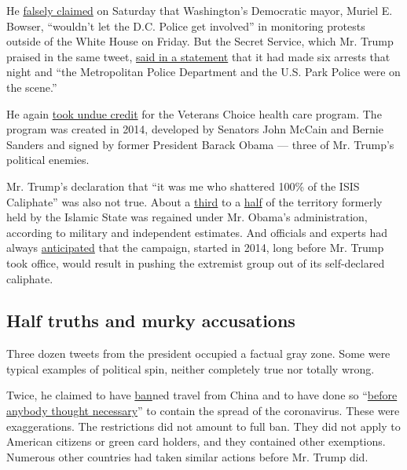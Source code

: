 He
\href{https://twitter.com/realDonaldTrump/status/1266711224391213056}{falsely
claimed} on Saturday that Washington's Democratic mayor, Muriel E.
Bowser, ``wouldn't let the D.C. Police get involved'' in monitoring
protests outside of the White House on Friday. But the Secret Service,
which Mr. Trump praised in the same tweet,
\href{https://www.secretservice.gov/data/press/releases/2020/20-MAY/Secret-Service-Statement-on-Pennsylvania-Avenue-Demonstrations.pdf}{said
in a statement} that it had made six arrests that night and ``the
Metropolitan Police Department and the U.S. Park Police were on the
scene.''

He again
\href{https://twitter.com/realDonaldTrump/status/1265834167272603649}{took
undue credit} for the Veterans Choice health care program. The program
was created in 2014, developed by Senators John McCain and Bernie
Sanders and signed by former President Barack Obama --- three of Mr.
Trump's political enemies.

Mr. Trump's declaration that ``it was me who shattered 100\% of the ISIS
Caliphate'' was also not true. About a
\href{https://news.ihsmarkit.com/prviewer/release_only/slug/aerospace-defense-security-islamic-state-territory-down-60-percent-and-revenue-down-80}{third}
to a
\href{https://web.archive.org/web/20171222214247/https://www.state.gov/r/pa/prs/ps/2017/12/276746.htm}{half}
of the territory formerly held by the Islamic State was regained under
Mr. Obama's administration, according to military and independent
estimates. And officials and experts had always
\href{https://www.nytimes3xbfgragh.onion/2017/10/17/us/politics/trump-islamic-state-raqqa-fact-check.html}{anticipated}
that the campaign, started in 2014, long before Mr. Trump took office,
would result in pushing the extremist group out of its self-declared
caliphate.

\hypertarget{half-truths-and-murky-accusations}{%
\subsection{Half truths and murky
accusations}\label{half-truths-and-murky-accusations}}

Three dozen tweets from the president occupied a factual gray zone. Some
were typical examples of political spin, neither completely true nor
totally wrong.

Twice, he claimed to have
\href{https://twitter.com/realDonaldTrump/status/1265301249630654467}{ban}ned
travel from China and to have done so
``\href{https://twitter.com/realDonaldTrump/status/1265633761024188417}{before
anybody thought necessary}'' to contain the spread of the coronavirus.
These were exaggerations. The restrictions did not amount to full ban.
They did not apply to American citizens or green card holders, and they
contained other exemptions. Numerous other countries had taken similar
actions before Mr. Trump did.

